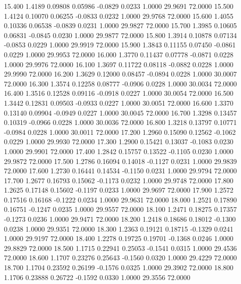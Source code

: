   15.400   1.4189   0.09808   0.05986  -0.0829   0.0233   1.0000  29.9691  72.0000
  15.500   1.4124   0.10070   0.06255  -0.0833   0.0232   1.0000  29.9768  72.0000
  15.600   1.4055   0.10336   0.06538  -0.0839   0.0231   1.0000  29.9827  72.0000
  15.700   1.3985   0.10605   0.06831  -0.0845   0.0230   1.0000  29.9877  72.0000
  15.800   1.3914   0.10878   0.07134  -0.0853   0.0229   1.0000  29.9919  72.0000
  15.900   1.3843   0.11155   0.07450  -0.0861   0.0229   1.0000  29.9953  72.0000
  16.000   1.3770   0.11437   0.07778  -0.0871   0.0228   1.0000  29.9976  72.0000
  16.100   1.3697   0.11722   0.08118  -0.0882   0.0228   1.0000  29.9990  72.0000
  16.200   1.3629   0.12000   0.08457  -0.0894   0.0228   1.0000  30.0007  72.0000
  16.300   1.3574   0.12258   0.08777  -0.0906   0.0228   1.0000  30.0034  72.0000
  16.400   1.3516   0.12528   0.09116  -0.0918   0.0227   1.0000  30.0054  72.0000
  16.500   1.3442   0.12831   0.09503  -0.0933   0.0227   1.0000  30.0051  72.0000
  16.600   1.3370   0.13140   0.09904  -0.0949   0.0227   1.0000  30.0045  72.0000
  16.700   1.3298   0.13457   0.10319  -0.0966   0.0228   1.0000  30.0036  72.0000
  16.800   1.3218   0.13797   0.10771  -0.0984   0.0228   1.0000  30.0011  72.0000
  17.200   1.2960   0.15090   0.12562  -0.1062   0.0229   1.0000  29.9930  72.0000
  17.300   1.2900   0.15421   0.13037  -0.1083   0.0230   1.0000  29.9901  72.0000
  17.400   1.2842   0.15757   0.13522  -0.1105   0.0230   1.0000  29.9872  72.0000
  17.500   1.2786   0.16094   0.14018  -0.1127   0.0231   1.0000  29.9839  72.0000
  17.600   1.2730   0.16441   0.14534  -0.1150   0.0231   1.0000  29.9794  72.0000
  17.700   1.2677   0.16793   0.15062  -0.1173   0.0232   1.0000  29.9748  72.0000
  17.800   1.2625   0.17148   0.15602  -0.1197   0.0233   1.0000  29.9697  72.0000
  17.900   1.2572   0.17516   0.16168  -0.1222   0.0234   1.0000  29.9631  72.0000
  18.000   1.2521   0.17890   0.16751  -0.1247   0.0235   1.0000  29.9557  72.0000
  18.100   1.2471   0.18275   0.17357  -0.1273   0.0236   1.0000  29.9471  72.0000
  18.200   1.2418   0.18686   0.18012  -0.1300   0.0238   1.0000  29.9351  72.0000
  18.300   1.2363   0.19121   0.18715  -0.1329   0.0241   1.0000  29.9197  72.0000
  18.400   1.2278   0.19725   0.19701  -0.1368   0.0246   1.0000  29.8829  72.0000
  18.500   1.1715   0.22941   0.25053  -0.1541   0.0315   1.0000  29.4536  72.0000
  18.600   1.1707   0.23276   0.25643  -0.1560   0.0320   1.0000  29.4229  72.0000
  18.700   1.1704   0.23592   0.26199  -0.1576   0.0325   1.0000  29.3902  72.0000
  18.800   1.1706   0.23888   0.26722  -0.1592   0.0330   1.0000  29.3556  72.0000
